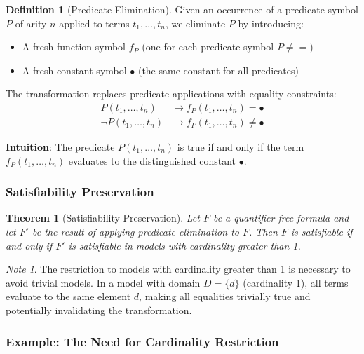 \documentclass[11pt,a4paper]{article}
\theoremstyle{definition}
\newtheorem{definition}{Definition}[section]
\theoremstyle{plain}
\newtheorem{theorem}{Theorem}[section]
\theoremstyle{remark}
\newtheorem*{remark}{Note}
\begin{document}
\begin{tcolorbox}[colback=yellow!10!white,colframe=yellow!75!black,title=\textbf{Predicate Elimination}]
\begin{definition}[Predicate Elimination]
Given an occurrence of a predicate symbol $P$ of arity $n$ applied to terms $t_1, \dots, t_n$, we eliminate $P$ by introducing:
\begin{itemize}
    \item A fresh function symbol $f_P$ (one for each predicate symbol $P \neq {=}$)
    \item A fresh constant symbol $\bullet$ (the same constant for all predicates)
\end{itemize}

The transformation replaces predicate applications with equality constraints:
\begin{align*}
P(t_1, \dots, t_n) &\mapsto f_P(t_1, \dots, t_n) = \bullet \\
\neg P(t_1, \dots, t_n) &\mapsto f_P(t_1, \dots, t_n) \neq \bullet
\end{align*}
\end{definition}
\end{tcolorbox}

\textbf{Intuition}: The predicate $P(t_1, \dots, t_n)$ is true if and only if the term $f_P(t_1, \dots, t_n)$ evaluates to the distinguished constant $\bullet$.

\subsubsection{Satisfiability Preservation}

\begin{theorem}[Satisfiability Preservation]
Let $F$ be a quantifier-free formula and let $F'$ be the result of applying predicate elimination to $F$. Then $F$ is satisfiable if and only if $F'$ is satisfiable in models with cardinality greater than 1.
\end{theorem}

\begin{remark}
The restriction to models with cardinality greater than 1 is necessary to avoid trivial models. In a model with domain $D = \{d\}$ (cardinality 1), all terms evaluate to the same element $d$, making all equalities trivially true and potentially invalidating the transformation.
\end{remark}

\subsubsection{Example: The Need for Cardinality Restriction}
\end{document}
